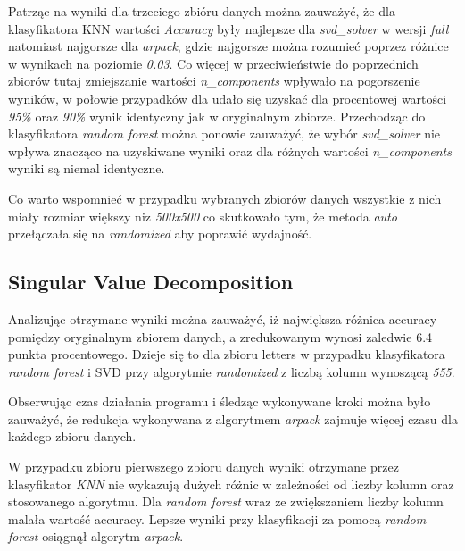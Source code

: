 \documentclass{classrep}
\begin{document}
{{            Patrząc na wyniki dla trzeciego zbióru danych \cite{dataset_documents}
            można zauważyć, że dla klasyfikatora KNN wartości \textit{Accuracy} były
            najlepsze dla \textit{svd\_solver} w wersji \textit{full} natomiast najgorsze
            dla \textit{arpack}, gdzie najgorsze można rozumieć poprzez różnice w
            wynikach na poziomie \textit{0.03}. Co więcej w przeciwieństwie do
            poprzednich zbiorów tutaj zmiejszanie wartości \textit{n\_components} wpływało
            na pogorszenie wyników, w połowie przypadków dla udało się uzyskać dla
            procentowej wartości \textit{95\%} oraz \textit{90\%} wynik identyczny jak
            w oryginalnym zbiorze. Przechodząc do klasyfikatora \textit{random forest}
            można ponowie zauważyć, że wybór \textit{svd\_solver} nie wpływa znacząco
            na uzyskiwane wyniki oraz dla różnych wartości \textit{n\_components}
            wyniki są niemal identyczne.

            Co warto wspomnieć w przypadku wybranych zbiorów danych wszystkie z nich
            miały rozmiar większy niz \textit{500x500} co skutkowało tym, że metoda
            \textit{auto} przełączała się na \textit{randomized} aby poprawić wydajność.

        }

        \subsection{Singular Value Decomposition} {
            Analizując otrzymane wyniki można zauważyć, iż największa różnica accuracy
            pomiędzy oryginalnym zbiorem danych, a zredukowanym wynosi zaledwie 6.4
            punkta procentowego. Dzieje się to dla zbioru letters w przypadku
            klasyfikatora \textit{random forest} i SVD przy algorytmie
            \textit{randomized} z liczbą kolumn wynoszącą \textit{555}.

            Obserwując czas działania programu i śledząc wykonywane kroki można było
            zauważyć, że redukcja wykonywana z algorytmem \textit{arpack} zajmuje
            więcej czasu dla każdego zbioru danych.

            W przypadku zbioru pierwszego zbioru danych \cite{dataset_letters} wyniki
            otrzymane przez klasyfikator \textit{KNN} nie wykazują dużych różnic w
            zależności od liczby kolumn oraz stosowanego algorytmu. Dla \textit{random
            forest} wraz ze zwiększaniem liczby kolumn malała wartość accuracy. Lepsze
            wyniki przy klasyfikacji za pomocą \textit{random forest} osiągnął algorytm
            \textit{arpack}.

}}
\end{document}
